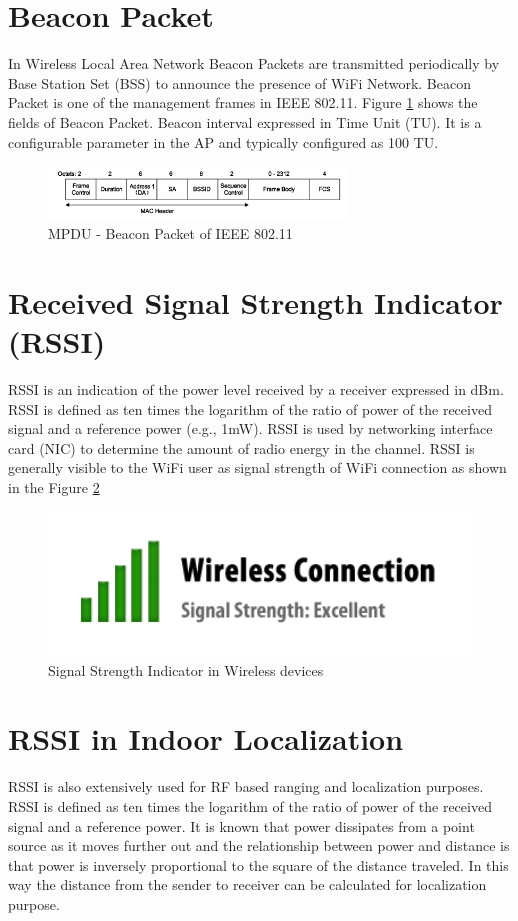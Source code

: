 \documentclass[11pt,a4paper,headinclude,footinclude,chapterprefix=on]{scrreprt}
\begin{document}
\section{Beacon Packet} In Wireless Local Area Network Beacon Packets are transmitted periodically by Base Station Set (BSS) to announce the presence of WiFi Network. Beacon Packet is one of the management frames in IEEE 802.11. Figure \ref{fig:beacon} shows the fields of Beacon Packet. Beacon interval expressed in Time Unit (TU). It is a configurable parameter in the AP and typically configured as 100 TU. 
\begin{figure}
	[!h] \centering 
	\includegraphics[width=8cm]{Images/beacon_frame.png} \caption{MPDU - Beacon Packet of IEEE 802.11} \label{fig:beacon} 
\end{figure}

\section{Received Signal Strength Indicator (RSSI)} RSSI is an indication of the power level received by a receiver expressed in dBm. RSSI is defined as ten times the logarithm of the ratio of power of the received signal and a reference power (e.g., 1mW). RSSI is used by networking interface card (NIC) to determine the amount of radio energy in the channel. RSSI is generally visible to the WiFi user as signal strength of WiFi connection as shown in the Figure \ref{fig:rssi} 
\begin{figure}
	[!h] \centering 
	\includegraphics[width=13cm]{Images/rssi.png} \caption{Signal Strength Indicator in Wireless devices } \label{fig:rssi} 
\end{figure}

\section{RSSI in Indoor Localization} RSSI is also extensively used for RF based ranging and localization purposes. RSSI is defined as ten times the logarithm of the ratio of power of the received signal and a reference power. It is known that power dissipates from a point source as it moves further out and the relationship between power and distance is that power is inversely proportional to the square of the distance traveled. In this way the distance from the sender to receiver can be calculated for localization purpose.
\end{document}

